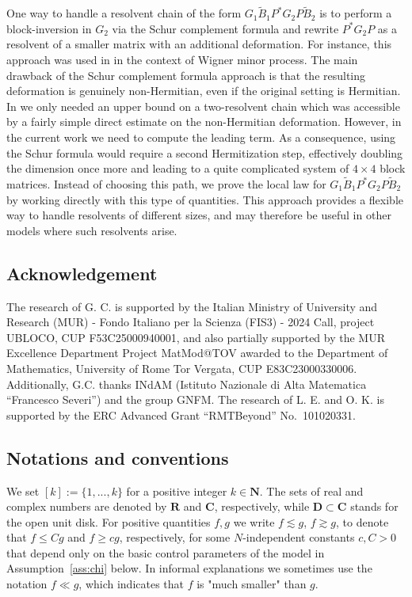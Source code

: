 \documentclass[10pt]{amsart}
\numberwithin{equation}{section}
\newcommand{\R}{\mathbf{R}}
\newcommand{\C}{\mathbf{C}}
\newcommand{\N}{\mathbf{N}}
\begin{document}
One way to handle a resolvent chain of the form $G_1\widetilde{B}_1P^*G_2P\widetilde{B}_2$ is to perform a block-inversion in $G_2$ via the Schur complement formula and rewrite $P^*G_2P$ as a resolvent of a smaller matrix with an additional deformation. For instance, this approach was used in \cite[Section~4]{minor} in the context of Wigner minor process. The main drawback of the Schur complement formula approach  is that the resulting deformation is genuinely non-Hermitian, even if the original setting is Hermitian. In \cite{minor} we only needed an upper bound on a two-resolvent chain which was accessible by a fairly simple direct estimate on the non-Hermitian deformation. However, in the current work we need to compute the leading term.  As a consequence, using the Schur formula would require a second Hermitization step,  effectively doubling the dimension once more and leading to a quite complicated system of $4\times 4$ block matrices. Instead of choosing this path, we prove the local law for $G_1\widetilde{B}_1P^*G_2P\widetilde{B}_2$ by working directly with this type of quantities.  This approach provides a flexible way to handle resolvents of different sizes, and may therefore be useful in other models where such resolvents arise.

\subsection*{Acknowledgement} The research of G. C. is supported by the Italian Ministry of University and Research (MUR) - Fondo Italiano per la Scienza (FIS3) - 2024 Call, project UBLOCO, CUP F53C25000940001, and also partially supported by the MUR Excellence Department Project MatMod@TOV awarded to the Department of Mathematics, University of Rome Tor Vergata, CUP E83C23000330006. Additionally, G.C. thanks INdAM (Istituto Nazionale di Alta Matematica “Francesco Severi”) and the group GNFM. The research of L. E. and O. K. is supported by the ERC Advanced Grant ``RMTBeyond'' No.~101020331.



\subsection*{Notations and conventions}
We set $[k] := \{1, ... , k\}$ for a positive integer $k \in \N$. The sets of real and complex numbers are denoted by $\R$ and $\C$, respectively, while $\mathbf{D}\subset \C$ stands for the open unit disk. For positive quantities $f, g$ we write $f \lesssim g$, $f \gtrsim g$, to denote that $f \le C g$ and $f \ge c g$, respectively, for some $N$-independent constants $c, C > 0$ that depend only on the basic control parameters of the model in Assumption~\ref{ass:chi} below. In informal explanations we sometimes use the notation $f\ll g$, which indicates that $f$ is "much smaller" than $g$.
\end{document}
